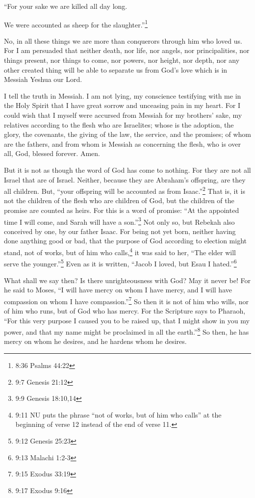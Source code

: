“For your sake we are killed all day long.

We were accounted as sheep for the slaughter.”\footnote{8:36 Psalms 44:22}

\myverse{}No, in all these things we are more than conquerors through
him who loved us.
\myverse{}For I am persuaded that neither death, nor life, nor angels, nor principalities,
nor things present, nor things to come, nor powers,
\myverse{}nor height, nor depth, nor any other created thing will be able to separate
us from God’s love which is in Messiah Yeshua our Lord.


\mychapter{} \myverse*{}I tell the truth in Messiah. I am not lying, my conscience testifying
with me in the Holy Spirit
\myverse{}that I have great sorrow and unceasing pain in my heart.
\myverse{}For I could wish that I myself were accursed from Messiah for my brothers’ sake,
my relatives according to the flesh
\myverse{}who are Israelites; whose is the adoption, the glory, the covenants, the giving
of the law, the service, and the promises;
\myverse{}of whom are the fathers, and from whom is Messiah as concerning the flesh, who
is over all, God, blessed forever. Amen.

\myverse{}But it is not as though the word of God has come to nothing. For
they are not all Israel that are of Israel.
\myverse{}Neither, because they are Abraham’s offspring, are they all children. But, “your
offspring will be accounted as from Isaac.”\footnote{9:7 Genesis 21:12}
\myverse{}That is, it is not the children of the flesh who are children of God, but the
children of the promise are counted as heirs.
\myverse{}For this is a word of promise: “At the appointed time I will come, and Sarah
will have a son.”\footnote{9:9 Genesis 18:10,14}
\myverse{}Not only so, but Rebekah also conceived by one, by our father Isaac.
\myverse{}For being not yet born, neither having done anything good or bad, that the
purpose of God according to election might stand, not of works, but of him who calls,\footnote{9:11 NU puts the phrase “not of works, but of him who calls” at the beginning of verse 12 instead
	of the end of verse 11.}
\myverse{}it was said to her, “The elder will serve the younger.”\footnote{9:12 Genesis 25:23}
\myverse{}Even as it is written, “Jacob I loved, but Esau I hated.”\footnote{9:13 Malachi 1:2-3}

\myverse{}What shall we say then? Is there unrighteousness with God? May
it never be!
\myverse{}For he said to Moses, “I will have mercy on whom I have mercy, and I will
have compassion on whom I have compassion.”\footnote{9:15 Exodus 33:19}
\myverse{}So then it is not of him who wills, nor of him who runs, but of God who has
mercy.
\myverse{}For the Scripture says to Pharaoh, “For this very purpose I caused you to
be raised up, that I might show in you my power, and that my name might be proclaimed in all the earth.”\footnote{9:17 Exodus 9:16}
\myverse{}So then, he has mercy on whom he desires, and he hardens whom he desires.

